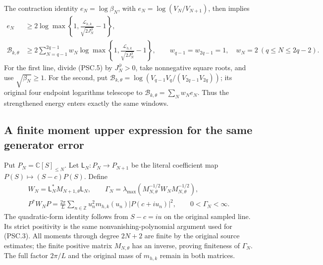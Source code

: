 The contraction identity \(e_N=\log\beta_N\), with
\(e_N=\log(V_N/V_{N+1})\), then implies
\[
 \begin{split}
 e_N&\ge
 2\log\max\left\{1,
       \frac{\mathcal L_{h,k}}{\sqrt{2J_N^\partial}}-1\right\},
 \\
 \mathcal B_{k,\theta}
 &\ge2\sum_{N=q-1}^{2q-1}w_N
 \log\max\left\{1,
       \frac{\mathcal L_{h,k}}{\sqrt{2J_N^\partial}}-1\right\},
 \qquad
 w_{q-1}=w_{2q-1}=1,\quad w_N=2\ (q\le N\le2q-2).
 \end{split}
 \tag{PSC.6}\label{CFStage:eq:psc-endpoints}
\]
For the first line, divide (PSC.5) by \(J_N^\partial>0\),
take nonnegative square roots, and use \(\sqrt{\beta_N}\ge1\).
For the second, put
\(\mathcal B_{k,\theta}
=\log(V_{q-1}V_q/(V_{2q-1}V_{2q}))\);
its original four endpoint logarithms telescope
to \(\mathcal B_{k,\theta}=\sum_Nw_Ne_N\).
Thus the strengthened energy enters exactly the same windows.

\subsection{A finite moment upper expression for the same generator error}
\label{CFStage:sec:psc-moments}

Put \(P_N=\mathbb C[S]_{\le N}\). Let
\(\mathsf L_N:P_N\to P_{N+1}\) be the literal coefficient map
\(P(S)\mapsto(S-c)P(S)\). Define
\[
 \begin{gathered}
 W_N=\mathsf L_N^*M_{N+1,\theta}\mathsf L_N,\qquad
 \Gamma_N=
 \lambda_{\max}(M_{N,\theta}^{-1/2}W_NM_{N,\theta}^{-1/2}),\\
 P^*W_NP=
 \frac{2\pi}{L}\sum_{n\in\mathbb Z}
 u_n^2m_{h,k}(u_n)|P(c+iu_n)|^2,\qquad
 0<\Gamma_N<\infty .
 \end{gathered}
 \tag{PSC.7}\label{CFStage:eq:psc-moment}
\]
The quadratic-form identity follows from \(S-c=iu\) on the
original sampled line. Its strict positivity is the same
nonvanishing-polynomial argument used for (PSC.3).
All moments through degree \(2N+2\) are finite by the original
source estimates; the finite positive matrix \(M_{N,\theta}\)
has an inverse, proving finiteness of \(\Gamma_N\).
The full factor \(2\pi/L\) and the original mass of \(m_{h,k}\)
remain in both matrices.

